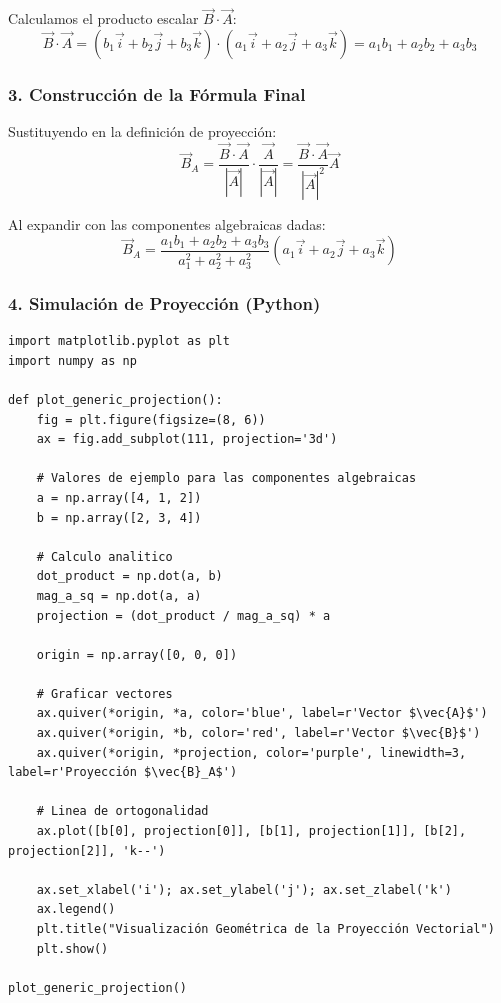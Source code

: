 \documentclass[12pt, a4paper]{article}
\begin{document}
Calculamos el producto escalar $\vec{B} \cdot \vec{A}$:
\begin{equation*}
    \vec{B} \cdot \vec{A} = (b_1\vec{i} + b_2\vec{j} + b_3\vec{k}) \cdot (a_1\vec{i} + a_2\vec{j} + a_3\vec{k}) = a_1b_1 + a_2b_2 + a_3b_3
\end{equation*}

\subsubsection*{3. Construcción de la Fórmula Final}
Sustituyendo en la definición de proyección:
\begin{equation*}
    \vec{B}_A = \frac{\vec{B} \cdot \vec{A}}{|\vec{A}|} \cdot \frac{\vec{A}}{|\vec{A}|} = \frac{\vec{B} \cdot \vec{A}}{|\vec{A}|^2} \vec{A}
\end{equation*}

Al expandir con las componentes algebraicas dadas:
\begin{equation*}
    \vec{B}_A = \frac{a_1b_1 + a_2b_2 + a_3b_3}{a_1^2 + a_2^2 + a_3^2} (a_1\vec{i} + a_2\vec{j} + a_3\vec{k})
\end{equation*}

\subsubsection*{4. Simulación de Proyección (Python)}
\begin{lstlisting}
import matplotlib.pyplot as plt
import numpy as np

def plot_generic_projection():
    fig = plt.figure(figsize=(8, 6))
    ax = fig.add_subplot(111, projection='3d')
    
    # Valores de ejemplo para las componentes algebraicas
    a = np.array([4, 1, 2])
    b = np.array([2, 3, 4])
    
    # Calculo analitico
    dot_product = np.dot(a, b)
    mag_a_sq = np.dot(a, a)
    projection = (dot_product / mag_a_sq) * a
    
    origin = np.array([0, 0, 0])
    
    # Graficar vectores
    ax.quiver(*origin, *a, color='blue', label=r'Vector $\vec{A}$')
    ax.quiver(*origin, *b, color='red', label=r'Vector $\vec{B}$')
    ax.quiver(*origin, *projection, color='purple', linewidth=3, label=r'Proyección $\vec{B}_A$')
    
    # Linea de ortogonalidad
    ax.plot([b[0], projection[0]], [b[1], projection[1]], [b[2], projection[2]], 'k--')
    
    ax.set_xlabel('i'); ax.set_ylabel('j'); ax.set_zlabel('k')
    ax.legend()
    plt.title("Visualización Geométrica de la Proyección Vectorial")
    plt.show()

plot_generic_projection()
\end{lstlisting}
\end{document}
